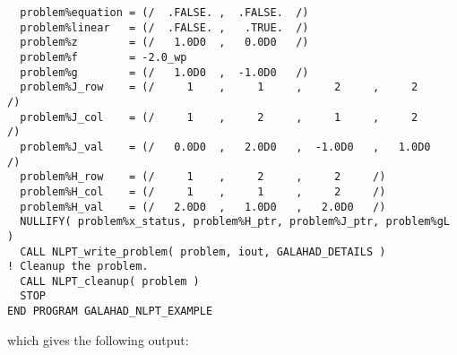 \documentclass{galahad}
\begin{document}
{\begin{verbatim}
  problem%equation = (/  .FALSE. ,  .FALSE.  /)
  problem%linear   = (/  .FALSE. ,   .TRUE.  /)
  problem%z        = (/   1.0D0  ,   0.0D0   /)
  problem%f        = -2.0_wp
  problem%g        = (/   1.0D0  ,  -1.0D0   /)
  problem%J_row    = (/     1    ,     1     ,     2     ,     2     /)
  problem%J_col    = (/     1    ,     2     ,     1     ,     2     /)
  problem%J_val    = (/   0.0D0  ,   2.0D0   ,  -1.0D0   ,   1.0D0   /)
  problem%H_row    = (/     1    ,     2     ,     2     /)
  problem%H_col    = (/     1    ,     1     ,     2     /)
  problem%H_val    = (/   2.0D0  ,   1.0D0   ,   2.0D0   /)
  NULLIFY( problem%x_status, problem%H_ptr, problem%J_ptr, problem%gL )
  CALL NLPT_write_problem( problem, iout, GALAHAD_DETAILS )
! Cleanup the problem.
  CALL NLPT_cleanup( problem )
  STOP
END PROGRAM GALAHAD_NLPT_EXAMPLE
\end{verbatim}
}
which gives the following output:
\end{document}
